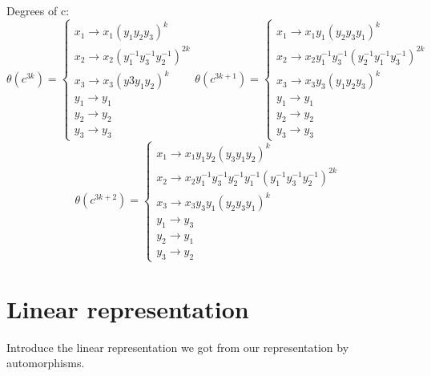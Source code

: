 \documentclass{article}
\begin{document}
Degrees of c:
$$
\theta(c^{3k}) =
\begin{cases}
	x_1 \rightarrow x_1 (y_1 y_2y_3)^{k}\\
	x_2 \rightarrow x_2 (y_1^{-1} y_3^{-1} y_2^{-1})^{2k}\\
	x_3 \rightarrow x_3 (y3 y_1 y_2)^{k}\\
	y_1 \rightarrow y_1\\
	y_2 \rightarrow y_2\\
	y_3 \rightarrow y_3
\end{cases}
\theta(c^{3k+1}) =
\begin{cases}
	x_1 \rightarrow x_1 y_1 (y_2 y_3 y_1)^{k}\\
	x_2 \rightarrow x_2 y_1^{-1} y_3^{-1}(y_2^{-1} y_1^{-1} y_3^{-1})^{2k}\\
	x_3 \rightarrow x_3 y_3 (y_1 y_2 y_3)^k\\
	y_1 \rightarrow y_1\\
	y_2 \rightarrow y_2\\
	y_3 \rightarrow y_3
\end{cases} 
$$
$$
\theta(c^{3k+2}) =
\begin{cases}
	x_1 \rightarrow x_1 y_1 y_2 (y_3 y_1 y_2)^{k} \\
	x_2 \rightarrow x_2 y_1^{-1} y_3^{-1} y_2^{-1} y_1^{-1} (y_1^{-1} y_3^{-1} y_2^{-1})^{2k}\\
	x_3 \rightarrow x_3 y_3 y_1 (y_2 y_3 y_1)^k\\
	y_1 \rightarrow y_3\\
	y_2 \rightarrow y_1\\
	y_3 \rightarrow y_2
\end{cases}
$$
\section{Linear representation}
Introduce the linear representation we got from our representation by automorphisms.
\end{document}
